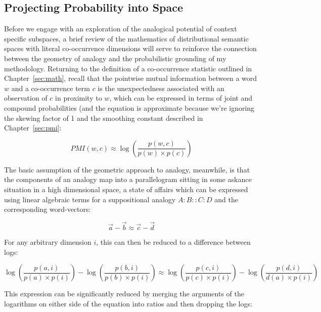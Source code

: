 \subsection{Projecting Probability into Space}
Before we engage with an exploration of the analogical potential of context specific subspaces, a brief review of the mathematics of distributional semantic spaces with literal co-occurrence dimensions will serve to reinforce the connection between the geometry of analogy and the probabilistic grounding of my methodology.  Returning to the definition of a co-occurrence statistic outlined in Chapter~\ref{sec:math}, recall that the pointwise mutual information between a word $w$ and a co-occurrence term $c$ is the unexpectedness associated with an observation of $c$ in proximity to $w$, which can be expressed in terms of joint and compound probabilities (and the equation is approximate because we're ignoring the skewing factor of 1 and the smoothing constant described in Chapter~\ref{sec:pmi}:

\begin{equation}
PMI(w,c) \approx \log\left(\frac{p(w,c)}{p(w) \times p(c)}\right)
\end{equation}

\noindent The basic assumption of the geometric approach to analogy, meanwhile, is that the components of an analogy map into a parallelogram sitting in some askance situation in a high dimensional space, a state of affairs which can be expressed using linear algebraic terms for a suppositional analogy $A:B :: C:D$ and the corresponding word-vectors:

\begin{equation}
\overrightarrow{a} - \overrightarrow{b} \approx \overrightarrow{c} - \overrightarrow{d}
\end{equation}

\noindent For any arbitrary dimension $i$, this can then be reduced to a difference between logs:

\begin{equation}
\log\left(\frac{p(a,i)}{p(a) \times p(i)}\right) - \log\left(\frac{p(b,i)}{p(b) \times p(i)}\right) \approx \log\left(\frac{p(c,i)}{p(c) \times p(i)}\right) - \log\left(\frac{p(d,i)}{d(a) \times p(i)}\right)
\end{equation}

\noindent This expression can be significantly reduced by merging the arguments of the logarithms on either side of the equation into ratios and then dropping the logs:

